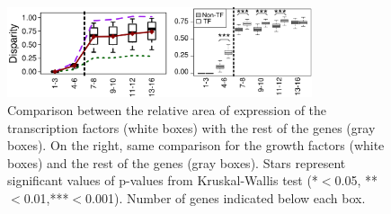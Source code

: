 \begin{figure}[h]
  \includegraphics[width=0.8\textwidth]{./Images/Art-I/disparity.png}
  \centering
  \caption{Comparison between the relative area of expression of the transcription factors (white boxes) with the rest of the genes (gray boxes). On the right, same comparison for the growth factors (white boxes) and the rest of the genes (gray boxes). Stars represent significant values of p-values from Kruskal-Wallis test (*$<$0.05, **$<$0.01,***$<$0.001). Number of genes indicated below each box. }
  \label{fig:Art-I-disparity}
\end{figure}


